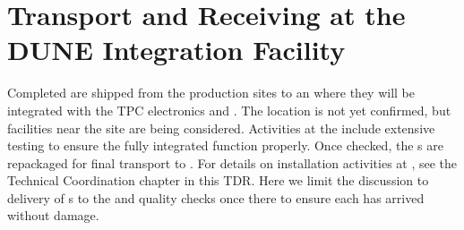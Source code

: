 \section{Transport and Receiving at the DUNE Integration Facility}
\label{sec:fdsp-apa-transport}

Completed  are shipped from the  production sites to an  where they will be integrated with the TPC  electronics and .  The  location is not yet confirmed, but facilities near the \surf site are being considered.   Activities at the   include extensive  testing to ensure the fully integrated  function properly.  Once checked, the s are repackaged for final transport to \surf.  For details on installation activities at \surf, see the Technical Coordination chapter in this TDR.  Here we limit the discussion to delivery of s to the  and quality checks once there to ensure each  has arrived without damage. 




